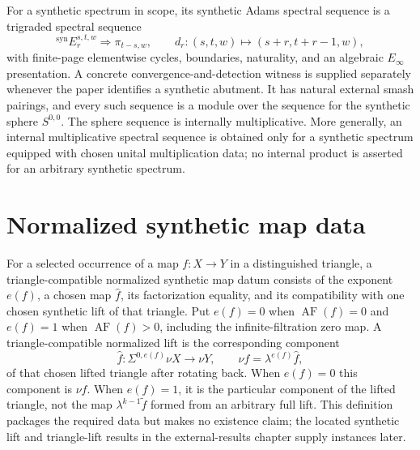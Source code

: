 \begin{definition}
  \label{def:synthetic-adams-ss}
  \notready
  For a synthetic spectrum in scope, its synthetic Adams spectral sequence is
  a trigraded spectral sequence
  \[
    {}^{\mathrm{syn}}E_r^{s,t,w}\Longrightarrow\pi_{t-s,w},
    \qquad d_r:(s,t,w)\mapsto(s+r,t+r-1,w),
  \]
  with finite-page elementwise cycles, boundaries, naturality, and an algebraic
  $E_\infty$ presentation.  A concrete convergence-and-detection witness is
  supplied separately whenever the paper identifies a synthetic abutment.  It has natural external smash pairings, and
  every such sequence is a module over the sequence for the synthetic sphere
  $S^{0,0}$.  The sphere sequence is internally multiplicative.  More
  generally, an internal multiplicative spectral sequence is obtained only
  for a synthetic spectrum equipped with chosen unital multiplication data;
  no internal product is asserted for an arbitrary synthetic spectrum.
\end{definition}

\section{Normalized synthetic map data}

\begin{definition}
  \label{def:synthetic-hat-map}
  \notready
  For a selected occurrence of a map $f:X\to Y$ in a distinguished triangle,
  a triangle-compatible normalized synthetic map datum consists of the
  exponent $e(f)$, a chosen map $\widehat f$, its factorization equality, and
  its compatibility with one chosen synthetic lift of that triangle.  Put
  $e(f)=0$ when
  $\operatorname{AF}(f)=0$ and $e(f)=1$ when
  $\operatorname{AF}(f)>0$, including the infinite-filtration zero map.  A
  triangle-compatible normalized lift is the corresponding component
  \[
    \widehat f:\Sigma^{0,e(f)}\nu X\longrightarrow\nu Y,
    \qquad \nu f=\lambda^{e(f)}\widehat f,
  \]
  of that chosen lifted triangle after rotating back.  When $e(f)=0$
  this component is $\nu f$.  When $e(f)=1$, it is the particular component of
  the lifted triangle, not the map $\lambda^{k-1}\widetilde f$ formed from an
  arbitrary full lift.  This definition packages the required data but makes
  no existence claim; the located synthetic lift and triangle-lift results in
  the external-results chapter supply instances later.
\end{definition}

